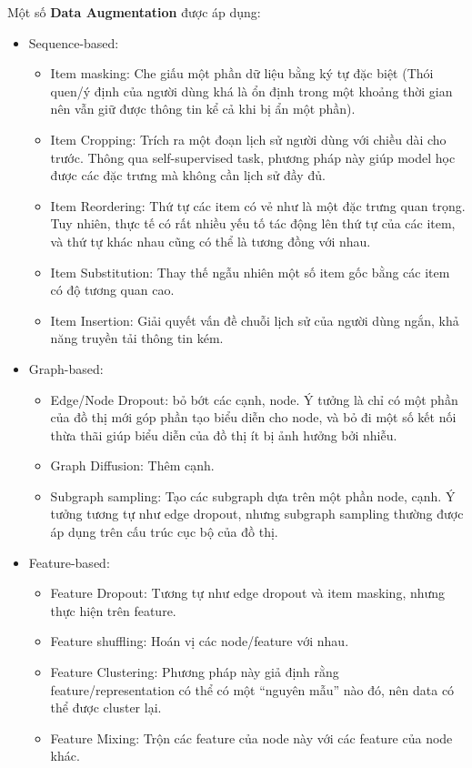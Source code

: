 \documentclass{article}[14pt]
\begin{document}
    Một số \textbf{Data Augmentation} \cite{sslsurvey} được áp dụng:
    \begin{itemize}[leftmargin=10mm]
        \item Sequence-based:
            \begin{itemize}
                \item Item masking: Che giấu một phần dữ liệu bằng ký tự đặc biệt (Thói quen/ý định của người dùng khá là ổn định trong một khoảng thời gian nên vẫn giữ được thông tin kể cả khi bị ẩn một phần).
                \item Item Cropping: Trích ra một đoạn lịch sử người dùng với chiều dài cho trước. Thông qua self-supervised task, phương pháp này giúp model học được các đặc trưng mà không cần lịch sử đầy đủ.
                \item Item Reordering: Thứ tự các item có vẻ như là một đặc trưng quan trọng. Tuy nhiên, thực tế có rất nhiều yếu tố tác động lên thứ tự của các item, và thứ tự khác nhau cũng có thể là tương đồng với nhau.
                \item Item Substitution: Thay thế ngẫu nhiên một số item gốc bằng các item có độ tương quan cao.
                \item Item Insertion: Giải quyết vấn đề chuỗi lịch sử của người dùng ngắn, khả năng truyền tải thông tin kém.
            \end{itemize}
        \item Graph-based:
            \begin{itemize}
                \item Edge/Node Dropout: bỏ bớt các cạnh, node. Ý tưởng là chỉ có một phần của đồ thị mới góp phần tạo biểu diễn cho node, và bỏ đi một số kết nối thừa thãi giúp biểu diễn của đồ thị ít bị ảnh hưởng bởi nhiễu.
                \item Graph Diffusion: Thêm cạnh.
                \item Subgraph sampling: Tạo các subgraph dựa trên một phần node, cạnh. Ý tưởng tương tự như edge dropout, nhưng subgraph sampling thường được áp dụng trên cấu trúc cục bộ của đồ thị.
            \end{itemize}
        \item Feature-based:
            \begin{itemize}
                \item Feature Dropout: Tương tự như edge dropout và item masking, nhưng thực hiện trên feature.
                \item Feature shuffling: Hoán vị các node/feature với nhau.
                \item Feature Clustering: Phương pháp này giả định rằng feature/representation có thể có một “nguyên mẫu” nào đó, nên data có thể được cluster lại.
                \item Feature Mixing: Trộn các feature của node này với các feature của node khác.
            \end{itemize}
    \end{itemize}
\end{document}

